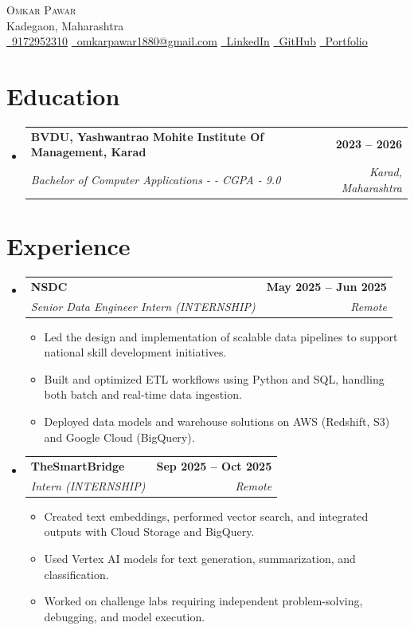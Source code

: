 \documentclass[letterpaper,11pt]{article}
\makeatletter
\newcommand{\resumeItem}[1]{
  \item\small{#1}
}
\newcommand{\resumeSubHeadingListStart}{\begin{itemize}[label={}]}
\newcommand{\resumeSubHeadingListEnd}{\end{itemize}}
\newcommand{\resumeItemListStart}{\begin{itemize}}
\newcommand{\resumeItemListEnd}{\end{itemize}}
\newcommand{\resumeSubheading}[4]{
  \item
  \begin{tabular*}{\textwidth}{l@{\extracolsep{\fill}}r}
    \textbf{#1} & \textbf{#2} \\
    \textit{#3} & \textit{#4}
  \end{tabular*}
}
\makeatother
\begin{document}
\begin{center}
  {\Huge \scshape Omkar Pawar} \\[2pt]
  Kadegaon, Maharashtra \\[6pt]

  \small
  \href{tel:9172952310}{\faPhone\ 9172952310}
  \quad
  \href{mailto:omkarpawar1880@gmail.com}{\faEnvelope\ omkarpawar1880@gmail.com}
  \quad
  \href{  }{\faLinkedin\ LinkedIn}
  \quad
  \href{  }{\faGithub\ GitHub}
  \quad
  \href{  }{\faGlobe\ Portfolio}
\end{center}

\section{Education}
\resumeSubHeadingListStart
\resumeSubheading{BVDU, Yashwantrao Mohite Institute Of Management, Karad}{2023 -- 2026}{Bachelor of Computer Applications -  - CGPA - 9.0}{Karad, Maharashtra}

\resumeSubHeadingListEnd

\section{Experience}
\resumeSubHeadingListStart
\resumeSubheading{NSDC}{May 2025 -- Jun 2025}{Senior Data Engineer Intern (INTERNSHIP)}{Remote}
\resumeItemListStart
\resumeItem{Led the design and implementation of scalable data pipelines to support national skill development initiatives.}
\resumeItem{Built and optimized ETL workflows using Python and SQL, handling both batch and real-time data ingestion.}
\resumeItem{Deployed data models and warehouse solutions on AWS (Redshift, S3) and Google Cloud (BigQuery).}
\resumeItemListEnd
\resumeSubheading{TheSmartBridge}{Sep 2025 -- Oct 2025}{Intern (INTERNSHIP)}{Remote}
\resumeItemListStart
\resumeItem{Created text embeddings, performed vector search, and integrated outputs with Cloud Storage and BigQuery.}
\resumeItem{Used Vertex AI models for text generation, summarization, and classification.}
\resumeItem{Worked on challenge labs requiring independent problem-solving, debugging, and model execution.}
\resumeItemListEnd

\resumeSubHeadingListEnd

\end{document}
